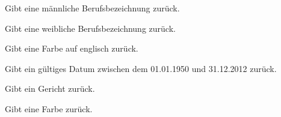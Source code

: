 \documentclass[a4paper,12pt,oneside]{sphinxmanual}
\begin{document}
\begin{fulllineitems}
\label{module:pyzufall.generator.beruf_m}
Gibt eine männliche Berufsbezeichnung zurück.

\end{fulllineitems}


\begin{fulllineitems}
\label{module:pyzufall.generator.beruf_w}
Gibt eine weibliche Berufsbezeichnung zurück.

\end{fulllineitems}


\begin{fulllineitems}
\label{module:pyzufall.generator.color}
Gibt eine Farbe auf englisch zurück.

\end{fulllineitems}


\begin{fulllineitems}
\label{module:pyzufall.generator.datum}
Gibt ein gültiges Datum zwischen dem 01.01.1950 und 31.12.2012 zurück.

\end{fulllineitems}


\begin{fulllineitems}
\label{module:pyzufall.generator.essen}
Gibt ein Gericht zurück.

\end{fulllineitems}


\begin{fulllineitems}
\label{module:pyzufall.generator.farbe}
Gibt eine Farbe zurück.

\end{fulllineitems}
\end{document}
